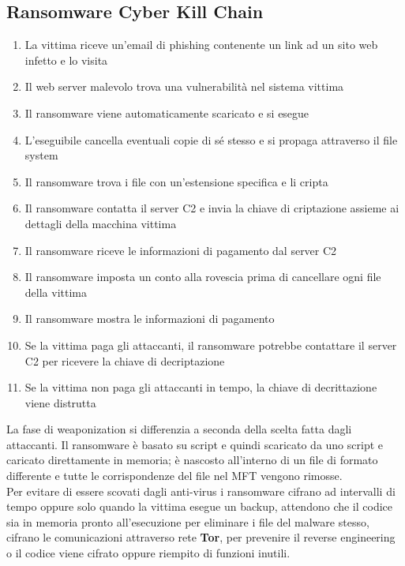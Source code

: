 \subsection{Ransomware Cyber Kill Chain}
\begin{enumerate}[noitemsep]
    \item La vittima riceve un'email di phishing contenente un link ad un sito web infetto e lo visita
    \item Il web server malevolo trova una vulnerabilità nel sistema vittima
    \item Il ransomware viene automaticamente scaricato e si esegue
    \item L'eseguibile cancella eventuali copie di sé stesso e si propaga attraverso il file system
    \item Il ransomware trova i file con un'estensione specifica e li cripta
    \item Il ransomware contatta il server \acrshort{C2} e invia la chiave di criptazione assieme ai dettagli della macchina vittima
    \item Il ransomware riceve le informazioni di pagamento dal server \acrshort{C2}
    \item Il ransomware imposta un conto alla rovescia prima di cancellare ogni file della vittima
    \item Il ransomware mostra le informazioni di pagamento
    \item Se la vittima paga gli attaccanti, il ransomware potrebbe contattare il server \acrshort{C2} per ricevere la chiave di decriptazione
    \item Se la vittima non paga gli attaccanti in tempo, la chiave di decrittazione viene distrutta
\end{enumerate}
La fase di weaponization si differenzia a seconda della scelta fatta dagli attaccanti.
Il ransomware è basato su script e quindi scaricato da uno script e caricato direttamente in memoria; è nascosto all'interno di un file di formato differente e tutte le corrispondenze del file nel \acrfull{MFT} vengono rimosse.\\
Per evitare di essere scovati dagli anti-virus i ransomware cifrano ad intervalli di tempo oppure solo quando la vittima esegue un backup, attendono che il codice sia in memoria pronto all'esecuzione per eliminare i file del malware stesso, cifrano le comunicazioni attraverso rete \textbf{Tor}, per prevenire il reverse engineering o il codice viene cifrato oppure riempito di funzioni inutili.\\
